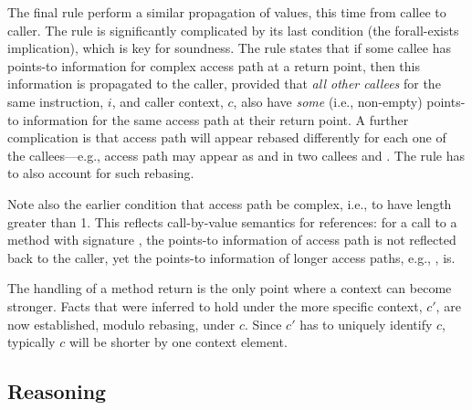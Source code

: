The final rule perform a similar propagation of values, this time
from callee to caller. 
The rule is significantly complicated by its last condition (the
forall-exists implication), which is key for soundness. The rule
states that if some callee has points-to information for complex
access path  at a return point, then this information is
propagated to the caller, provided that \emph{all other callees} for
the same instruction, \(i\), and caller context, \(c\), also have
\emph{some} (i.e., non-empty) points-to information for the same
access path  at their return point. A further complication is
that access path  will appear rebased differently for each
one of the callees---e.g., access path  may
appear as  and  in two
callees  and . The rule has to also account for
such rebasing.

Note also the earlier condition that access path  be complex,
i.e., to have length greater than 1. This reflects call-by-value
semantics for references: for a call  to a method with
signature , the points-to information of access path
 is not reflected back to the caller, yet the points-to
information of longer access paths, e.g., , is.

The handling of a method return is the only point where a context can
become stronger. Facts that were inferred to hold under the more
specific context, \(c'\), are now established, modulo rebasing, under
\(c\). Since \(c'\) has to uniquely identify \(c\), typically \(c\)
will be shorter by one context element.


\subsection{Reasoning}
\label{sec:reasoning}

